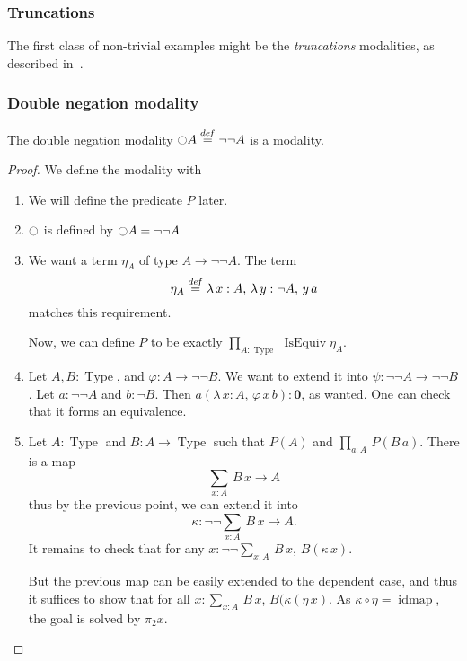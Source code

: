 \documentclass[notfinal]{jfrarticle}
\DeclareMathOperator{\Type}{Type}
\DeclareMathOperator{\IsEquiv}{IsEquiv}
\DeclareMathOperator{\idmap}{\mathrm{idmap}}
\newcommand \defeq {\overset{de\hspace{-0.2ex}f}{=}}
\newcommand{\modal}{\ensuremath{\ocircle}}
\newcommand \zero {\mathbf{0}}
\newcommand{\sumD}[3]{\sum_{#1:#2}\, #3}
\newcommand{\prodD}[3]{\prod_{#1:#2}\, #3}
\begin{document}
\subsubsection{Truncations}
\label{sssec:truncations}

The first class of non-trivial examples might be the {\em truncations}
modalities, as described in~\cite[Section 7.3]{hottbook}.

\subsubsection{Double negation modality}
\label{sssec:notnot}

\begin{prop}
  The double negation modality $\modal A \defeq \lnot\lnot A$ is a
  modality.  
\end{prop}
\begin{proof}
  We define the modality with
  \begin{enumerate}
  \item We will define the predicate $P$ later.
  \item $\modal$ is defined by $\modal A = \lnot\lnot A$
  \item We want a term $\eta_A$ of type $A \to \lnot \lnot A$.
    The term
    \[ \eta_A\defeq \lambda \, x:A,\,\lambda\, y:\lnot A,\, y\, a\] 
    matches this requirement.
    
    Now, we can define $P$ to be exactly $\prodD A \Type {\IsEquiv
      \eta_A}$.
  \item Let $A,B:\Type$, and $\varphi : A \to \lnot\lnot B$. We
    want to extend it into $\psi : \lnot\lnot A \to \lnot\lnot B$. Let
    $a:\lnot\lnot A$ and $b:\lnot B$.
    Then $a(\lambda\, x:A,\, \varphi\, x \, b) : \zero$, as
    wanted. One can check that it forms an equivalence.
  \item Let $A:\Type$ and $B:A\to\Type$ such that $P(A)$ and $\prodD a
    A {P(B\, a)}$. There is a map
    \[\sumD x A {B\, x} \to A \]
    thus by the previous point, we can extend it into 
    \[\kappa:\lnot\lnot\sumD x A {B\, x} \to A.\]
    It remains to check that for any $x:\lnot\lnot\sumD x A {B\, x}$,
    $B(\kappa\, x)$.

    But the previous map can be easily extended to the dependent case,
    and thus it suffices to show that for all $x:\sumD x A{B\, x}$,
    $B(\kappa(\eta\, x)$. As $\kappa \circ \eta = \idmap$, the goal is
    solved by $\pi_2 x$.
  \end{enumerate}
\end{proof}
\end{document}
